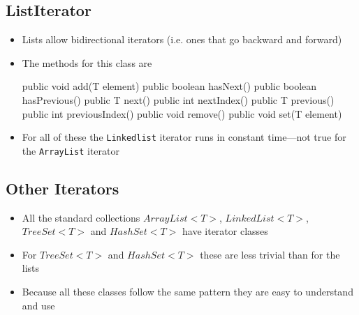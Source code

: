 
\begin{slide}
\section[-1.5]{ListIterator}

\begin{PauseHighLight}
  \begin{itemize}
  \item Lists allow bidirectional iterators (i.e. ones that go backward
    and forward)\pause
  \item The methods for this class are
    \begin{java}
      public void add(T element)
      public boolean hasNext()
      public boolean hasPrevious()
      public T next()
      public int nextIndex()
      public T previous()
      public int previousIndex()
      public void remove()
      public void set(T element)
    \end{java}\pause\vspace{-1cm}
  \item For all of these the \texttt{Linkedlist} iterator runs in constant
    time\pause---not true for the \texttt{ArrayList} iterator\pause
  \end{itemize}
\end{PauseHighLight}

\end{slide}


\begin{slide}
\section{Other Iterators}

\begin{PauseHighLight}
  \begin{itemize}
  \item All the standard collections \jl$ArrayList<T>$,
    \jl$LinkedList<T>$, \jl$TreeSet<T>$ and \jl$HashSet<T>$ have iterator
    classes\pause
  \item For \jl$TreeSet<T>$ and \jl$HashSet<T>$ these are less trivial
    than for the lists\pause
  \item Because all these classes follow the same pattern they are easy
    to understand and use\pause
  \end{itemize}
\end{PauseHighLight}
\end{slide}


